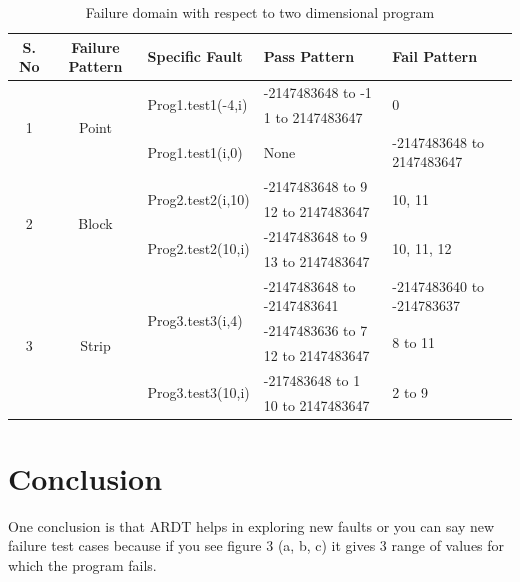 \documentclass{acm_proc_article-sp}
\begin{document}
\begin{table}[t]
\centering

\begin{tabular}{|c|c|l|l|l|}

\hline 

\textbf{S. No}		& \textbf{Failure Pattern}	& \textbf{Specific Fault}	 		& \textbf{Pass Pattern} 			& \textbf{Fail Pattern} 			\\ \hline 


\multirow{3}{*}{1} 	&\multirow{3}{*}{Point}	&\multirow{2}{*}{Prog1.test1(-4,i)}	&-2147483648 to -1				&\multirow{2}{*}{0}	  			\\ \cline{4-4} 
				&					&							&1 to 2147483647				&	                           			\\ \cline{3-5}
				&					&Prog1.test1(i,0)				&None						&-2147483648 to 2147483647 	\\ \hline
\multirow{4}{*}{2}	&\multirow{4}{*}{Block}	&\multirow{2}{*}{Prog2.test2(i,10)}	&-2147483648 to 9				&\multirow{2}{*}{10, 11}			\\ \cline{4-4} 
				&					&							&12 to 2147483647				&		   		   			\\ \cline{3-5} 
				&					&\multirow{2}{*}{Prog2.test2(10,i)}	&-2147483648 to 9				&\multirow{2}{*}{10, 11, 12}		\\ \cline{4-4} 
				&					&							&13 to 2147483647				&							\\ \hline
\multirow{5}{*}{3} 	&\multirow{5}{*}{Strip}	&\multirow{3}{*}{Prog3.test3(i,4)}	&-2147483648 to -2147483641	&-2147483640 to -214783637 		\\ \cline{4-5} 
				&					&	 						&-2147483636 to 7				&\multirow{2}{*}{8 to 11}			\\ \cline{4-4} 
				&					&	 						&12 to 2147483647				&							\\ \cline{3-5} 
				&					& \multirow{2}{*}{Prog3.test3(10,i)}	&-217483648 to 1				&\multirow{2}{*}{2 to 9}			\\ \cline{4-4}
				&					&	 						&10 to 2147483647				&							\\ \hline
\end{tabular}
\caption{Failure domain with respect to two dimensional program}
\label{tb:failtable}
\end{table}

\section{Conclusion} \label{sec:conclusion}
One conclusion is that ARDT helps in exploring new faults or you can say new failure test cases because if you see figure 3 (a, b, c) it gives 3 range of values for which the program fails. \\
\end{document}
